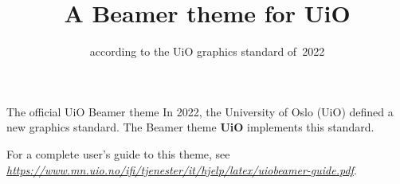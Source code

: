 \documentclass[UKenglish,aspectratio=169]{beamer}
\title{A Beamer theme for UiO}
\subtitle{according to the UiO graphics standard of~2022}
\begin{document}
\uiofrontpage[info={A minimal user guide},
  image={uio-beamer-segl-pos}]

\begin{frame}{The official UiO Beamer theme}
  In 2022, the University of Oslo (UiO) defined a new graphics
  standard. The Beamer theme \textbf{UiO} implements this standard.

  \bigskip
  For a complete user's guide to this theme, see
  \emph{\url{https://www.mn.uio.no/ifi/tjenester/it/hjelp/latex/uiobeamer-guide.pdf}}.
\end{frame}
\end{document}
